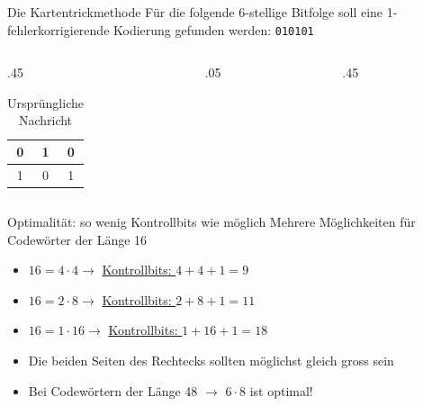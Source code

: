 \begin{frame}{Die Kartentrickmethode}
    Für die folgende 6-stellige Bitfolge soll eine 1-fehlerkorrigierende Kodierung gefunden werden: \texttt{010101}
    \begin{columns}
        \begin{column}{.45\textwidth}
            \begin{table}[H]
                \centering
                \begin{tabular}{c|c|c}
                    0 & 1 & 0 \\\midrule
                    1 & 0 & 1 \\
                \end{tabular}
                \caption*{Ursprüngliche Nachricht}
                \label{tab:ex-zauberer}
            \end{table}
        \end{column}
        \begin{column}{.05\textwidth}
        \end{column}
        \begin{column}{.45\textwidth}
        \end{column}
    \end{columns}
\end{frame}

\begin{frame}{Optimalität: so wenig Kontrollbits wie möglich}
    Mehrere Möglichkeiten für Codewörter der Länge 16
    \begin{itemize}[<+->]
        \item $16 = 4 \cdot 4 \rightarrow$ \underline{Kontrollbits: $4 + 4 + 1 = 9$}
        \item $16 = 2 \cdot 8 \rightarrow$ \underline{Kontrollbits: $2 + 8 + 1 = 11$}
        \item $16 = 1 \cdot 16 \rightarrow$ \underline{Kontrollbits: $1 + 16 + 1 = 18$}
        \item Die beiden Seiten des Rechtecks sollten möglichst gleich gross sein
        \item Bei Codewörtern der Länge 48 $\rightarrow$ $6 \cdot 8$ ist optimal!
    \end{itemize}
\end{frame}

